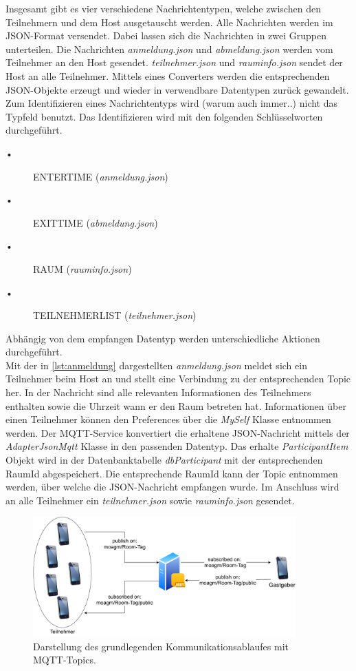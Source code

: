 Insgesamt gibt es vier verschiedene Nachrichtentypen, welche zwischen den Teilnehmern und dem Host ausgetauscht werden. Alle Nachrichten werden im JSON-Format versendet. 
Dabei lassen sich die Nachrichten in zwei Gruppen unterteilen.
Die Nachrichten \textit{anmeldung.json} und \textit{abmeldung.json} werden vom Teilnehmer an den Host gesendet. 
\textit{teilnehmer.json} und \textit{rauminfo.json} sendet der Host an alle Teilnehmer. 
Mittels eines Converters werden die entsprechenden JSON-Objekte erzeugt und wieder in verwendbare Datentypen zurück gewandelt. 
Zum Identifizieren eines Nachrichtentyps wird (warum auch immer..) nicht das Typfeld benutzt. 
Das Identifizieren wird mit den folgenden Schlüsselworten durchgeführt.
\begin{description}
\item[•] ENTERTIME (\textit{anmeldung.json})
\item[•] EXITTIME (\textit{abmeldung.json})
\item[•] RAUM (\textit{rauminfo.json})
\item[•] TEILNEHMERLIST (\textit{teilnehmer.json})
\end{description}
Abhängig von dem empfangen Datentyp werden unterschiedliche Aktionen durchgeführt.
\\
Mit der in \cref{lst:anmeldung} dargestellten \textit{anmeldung.json} meldet sich ein Teilnehmer beim Host an und stellt eine Verbindung zu der entsprechenden Topic her. In der Nachricht sind alle relevanten Informationen des Teilnehmers enthalten sowie die Uhrzeit wann er den Raum betreten hat.
Informationen über einen Teilnehmer können den Preferences über die \textit{MySelf} Klasse entnommen werden. 
Der MQTT-Service konvertiert die erhaltene JSON-Nachricht mittels der \textit{AdapterJsonMqtt} Klasse in den passenden Datentyp. 
Das erhalte \textit{ParticipantItem} Objekt wird in der Datenbanktabelle \textit{dbParticipant} mit der  entsprechenden RaumId abgespeichert. 
Die entsprechende RaumId kann der Topic entnommen werden, über welche die JSON-Nachricht empfangen wurde. 
Im Anschluss wird an alle Teilnehmer ein \textit{teilnehmer.json} sowie \textit{rauminfo.json} gesendet.
\begin{figure}
	\centering
	\includegraphics[width =0.9\textwidth]{images/mqttservice.pdf}
	\caption{Darstellung des grundlegenden Kommunikationsablaufes mit MQTT-Topics.}
	\label{img:mqtt}
\end{figure}
